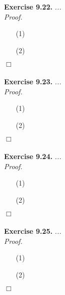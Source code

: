\documentclass{article}
\begin{document}



\textbf{Exercise 9.22.}
\emph{...} \\

\emph{Proof.}
\begin{enumerate}
\item[(1)]
\item[(2)]

\end{enumerate}
$\Box$ \\\\






\textbf{Exercise 9.23.}
\emph{...} \\

\emph{Proof.}
\begin{enumerate}
\item[(1)]
\item[(2)]

\end{enumerate}
$\Box$ \\\\






\textbf{Exercise 9.24.}
\emph{...} \\

\emph{Proof.}
\begin{enumerate}
\item[(1)]
\item[(2)]

\end{enumerate}
$\Box$ \\\\






\textbf{Exercise 9.25.}
\emph{...} \\

\emph{Proof.}
\begin{enumerate}
\item[(1)]
\item[(2)]

\end{enumerate}
$\Box$ \\\\
\end{document}
